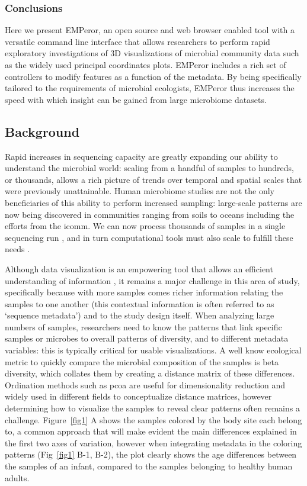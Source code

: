 \subsubsection{Conclusions}

Here we present EMPeror, an open source and web browser enabled tool with a versatile command line interface that allows researchers to perform rapid exploratory investigations of 3D visualizations of microbial community data such as the widely used principal coordinates plots. EMPeror includes a rich set of controllers to modify features as a function of the metadata. By being specifically tailored to the requirements of microbial ecologists, EMPeror thus increases the speed with which insight can be gained from large microbiome datasets.

\subsection{Background}

Rapid increases in sequencing capacity are greatly expanding our ability to understand the microbial world: scaling from a handful of samples to hundreds, or thousands, allows a rich picture of trends over temporal and spatial scales that were previously unattainable. Human microbiome studies are not the only beneficiaries of this ability to perform increased sampling: large\hyp{}scale patterns are now being discovered in communities ranging from soils \cite{RN108} to oceans \cite{RN115} including the efforts from the \gls{icomm}.  We can now process thousands of samples in a single sequencing run \cite{RN85}, and in turn computational tools must also scale to fulfill these needs \cite{RN53}.

Although data visualization is an empowering tool that allows an efficient understanding of information \cite{RN126}, it remains a major challenge in this area of study, specifically because with more samples comes richer information relating the samples to one another (this contextual information is often referred to as `sequence metadata') and to the study design itself. When analyzing large numbers of samples, researchers need to know the patterns that link specific samples or microbes to overall patterns of diversity, and to different metadata variables: this is typically critical for usable visualizations. A well know ecological metric to quickly compare the microbial composition of the samples is beta diversity, which collates them by creating a distance matrix of these differences. Ordination methods such as \gls{pcoa} \cite{RN109} are useful for dimensionality reduction and widely used in different fields to conceptualize distance matrices, however determining how to visualize the samples to reveal clear patterns often remains a challenge. Figure~\ref{fig1} A shows the samples colored by the body site each belong to, a common approach that will make evident the main differences explained in the first two axes of variation, however when integrating metadata in the coloring patterns  (Fig~\ref{fig1} B\hyp{}1, B\hyp{}2), the plot clearly shows the age differences between the samples of an infant, compared to the samples belonging to healthy human adults.

